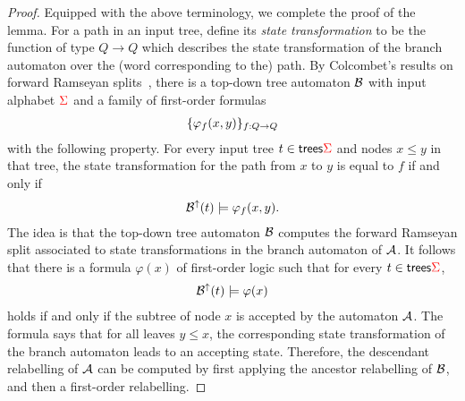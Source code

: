 \begin{proof}
    Equipped with the above terminology, we complete the proof of the lemma. For a path in an input tree, define its  \emph{state transformation} to be the function of type $Q \to Q$ which describes the state transformation of the branch automaton over the (word corresponding to the) path.  By Colcombet's results on forward Ramseyan splits~\cite[Lemma 3]{colcombetCombinatorialTheoremTrees2007},   there is a top-down tree automaton ${\mathcal B}$ with input alphabet ${\color{red}{\Sigma}}$  and a family of first-order formulas
\begin{align*}
\{\varphi_f(x,y)\}_{f : Q \to Q}
\end{align*}
with the following property. For every input tree $t \in \mathsf {trees} {\color{red}{\Sigma}}$ and nodes $x \le y$ in that tree, the state transformation for the path from $x$ to $y$ is equal to $f$ if and only if 
\begin{align*}
{\mathcal B}^{\uparrow}(t) \models \varphi_f(x,y).
\end{align*}
The idea is that the  top-down tree automaton ${\mathcal B}$ computes the forward Ramseyan split associated to state transformations in the branch automaton of ${\mathcal A}$. It follows that there is a formula $\varphi(x)$ of first-order logic such that for every $t \in \mathsf {trees} {\color{red}{\Sigma}}$, 
\begin{align*}
{\mathcal B}^{\uparrow}(t) \models \varphi(x)
\end{align*}
holds if and only if  the subtree of  node $x$ is accepted by the automaton ${\mathcal A}$. The formula says that for all leaves  $y \le x$, the corresponding state transformation of the branch automaton leads to an accepting state. Therefore, the descendant relabelling of ${\mathcal A}$ can be computed by first applying the ancestor relabelling of ${\mathcal B}$, and then a first-order relabelling.
\end{proof}


